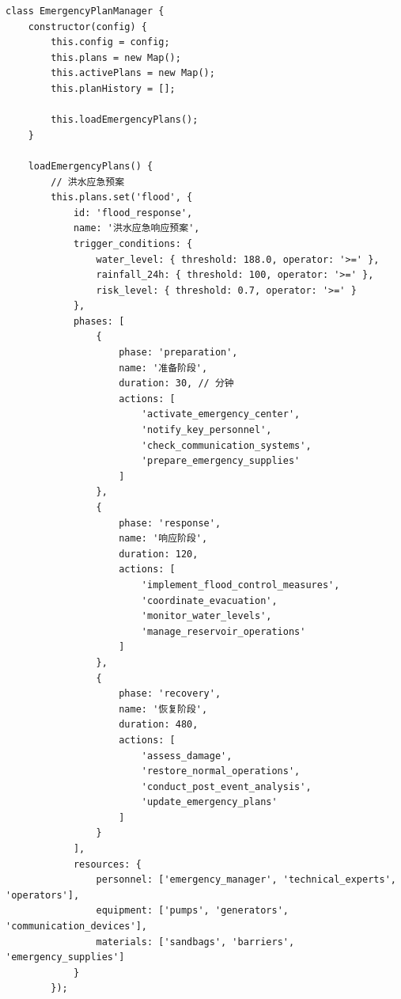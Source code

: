 \begin{lstlisting}
class EmergencyPlanManager {
    constructor(config) {
        this.config = config;
        this.plans = new Map();
        this.activePlans = new Map();
        this.planHistory = [];
        
        this.loadEmergencyPlans();
    }
    
    loadEmergencyPlans() {
        // 洪水应急预案
        this.plans.set('flood', {
            id: 'flood_response',
            name: '洪水应急响应预案',
            trigger_conditions: {
                water_level: { threshold: 188.0, operator: '>=' },
                rainfall_24h: { threshold: 100, operator: '>=' },
                risk_level: { threshold: 0.7, operator: '>=' }
            },
            phases: [
                {
                    phase: 'preparation',
                    name: '准备阶段',
                    duration: 30, // 分钟
                    actions: [
                        'activate_emergency_center',
                        'notify_key_personnel',
                        'check_communication_systems',
                        'prepare_emergency_supplies'
                    ]
                },
                {
                    phase: 'response',
                    name: '响应阶段',
                    duration: 120,
                    actions: [
                        'implement_flood_control_measures',
                        'coordinate_evacuation',
                        'monitor_water_levels',
                        'manage_reservoir_operations'
                    ]
                },
                {
                    phase: 'recovery',
                    name: '恢复阶段',
                    duration: 480,
                    actions: [
                        'assess_damage',
                        'restore_normal_operations',
                        'conduct_post_event_analysis',
                        'update_emergency_plans'
                    ]
                }
            ],
            resources: {
                personnel: ['emergency_manager', 'technical_experts', 'operators'],
                equipment: ['pumps', 'generators', 'communication_devices'],
                materials: ['sandbags', 'barriers', 'emergency_supplies']
            }
        });
        

\end{lstlisting}
